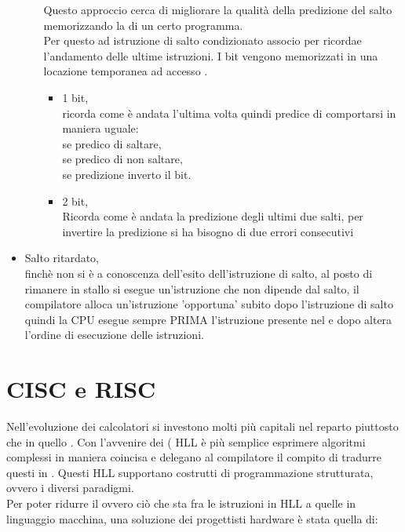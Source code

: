 \documentclass[arch.tex]{subfiles}
\begin{document}
\begin{itemize}
\begin{itemize}
				Questo approccio cerca di migliorare la qualità della 
				predizione del salto memorizzando la  di un certo programma.\\
				Per questo ad  istruzione di salto condizionato
				associo  per ricordae l'andamento delle ultime
				istruzioni. I bit vengono memorizzati in una locazione temporanea
				ad accesso .
				\begin{itemize}
					\item 1 bit,\\
						ricorda come è andata l'ultima volta quindi
						predice di comportarsi in maniera uguale:\\
						se  predico di saltare,\\
						se  predico di non saltare,\\
						se  predizione inverto il bit.
					\item 2 bit,\\
						Ricorda come è andata la predizione degli ultimi
						due salti, per invertire la predizione si 
						ha bisogno di due errori consecutivi
				\end{itemize}
		\end{itemize}
	\item Salto ritardato,\\
		finchè non si è a conoscenza dell'esito dell'istruzione di salto, al posto di 
		rimanere in stallo si esegue un'istruzione che non dipende dal salto,
		il compilatore alloca un'istruzione 'opportuna' subito dopo l'istruzione di salto
		quindi la CPU esegue sempre PRIMA l'istruzione presente nel 
		 e dopo altera l'ordine di esecuzione  delle istruzioni.

\end{itemize}

\section{CISC e RISC}%
\label{sec:cisc_e_risc}

Nell'evoluzione dei calcolatori si investono molti più capitali nel reparto  
piuttosto che in quello . Con l'avvenire dei  ( HLL 
è più semplice esprimere algoritmi complessi in maniera coincisa e delegano al compilatore il 
compito di tradurre questi in . Questi HLL supportano costrutti
di programmazione strutturata, ovvero i diversi paradigmi.\\
Per poter ridurre il  ovvero ciò che sta fra le istruzioni in HLL a quelle
in linguaggio macchina, una soluzione dei progettisti hardware è stata quella di:
\end{document}
